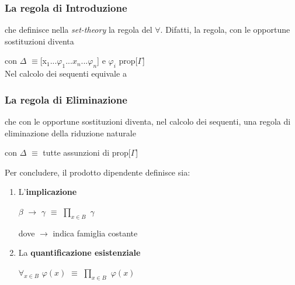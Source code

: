 \subsubsection{La regola di Introduzione}
\begin{prooftree}
\end{prooftree}
\noindent
che definisce nella \textit{set-theory} la regola del $\forall$. Difatti, la regola, con le opportune sostituzioni diventa
\begin{prooftree}
\end{prooftree}
\noindent
con $\Delta$ $\equiv$[x$_1$...$\varphi_1$...$x_n$...$\varphi_n$] e $\varphi_i$ prop[$\Gamma$]\\
Nel calcolo dei sequenti equivale a
\begin{prooftree}
\end{prooftree}
\noindent 
\subsubsection{La regola di Eliminazione}
\begin{prooftree}
\end{prooftree}
\noindent
che con le opportune sostituzioni diventa, nel calcolo dei sequenti, una regola di eliminazione della riduzione naturale
\begin{prooftree}
\end{prooftree}
con $\Delta$ $\equiv$ tutte assunzioni di prop[$\Gamma$]
\noindent

\vspace{0.5cm}
\noindent
Per concludere, il prodotto dipendente definisce sia:
\begin{enumerate}
\item L'\textbf{implicazione}
\begin{center} $\beta$ $\rightarrow$ $\gamma$ $\equiv$ $\prod\limits_{x \in B}$ $\gamma$ \end{center}
dove $\rightarrow$ indica famiglia costante
\item La \textbf{quantificazione esistenziale}
\begin{center}$\forall_{x \in B}$ $\varphi(x)$ $\equiv$ $\prod\limits_{x \in B}$ $\varphi(x)$ \end{center}
\end{enumerate}


